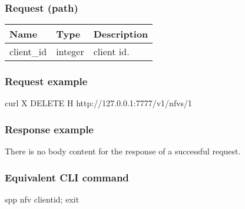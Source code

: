 \documentclass[a4paper,11pt,openany,oneside,english]{sphinxmanual}
\begin{document}
\subsubsection{Request (path)}
\label{\detokenize{api_ref/spp_nfv:id19}}

\begin{savenotes}\sphinxattablestart
\centering
{}
\sphinxthecaptionisattop
{}\label{\detokenize{api_ref/spp_nfv:id33}}\label{\detokenize{api_ref/spp_nfv:table-spp-ctl-nfvs-delete}}
\sphinxaftertopcaption
\begin{tabulary}{\linewidth}[t]{|T|T|T|}
\hline
\sphinxstyletheadfamily 
Name
&\sphinxstyletheadfamily 
Type
&\sphinxstyletheadfamily 
Description
\\
\hline
client\_id
&
integer
&
client id.
\\
\hline
\end{tabulary}
\par
\sphinxattableend\end{savenotes}


\subsubsection{Request example}
\label{\detokenize{api_ref/spp_nfv:id20}}
\begin{sphinxVerbatim}[commandchars=\\\{\},formatcom=\footnotesize]
 curl \PYGZhy{}X DELETE \PYGZhy{}H  
  http://127.0.0.1:7777/v1/nfvs/1
\end{sphinxVerbatim}


\subsubsection{Response example}
\label{\detokenize{api_ref/spp_nfv:id21}}
There is no body content for the response of a successful  request.


\subsubsection{Equivalent CLI command}
\label{\detokenize{api_ref/spp_nfv:id22}}
\begin{sphinxVerbatim}[commandchars=\\\{\},formatcom=\footnotesize]
spp \PYGZgt{} nfv \PYGZob{}client\PYGZus{}id\PYGZcb{}; exit
\end{sphinxVerbatim}
\end{document}
